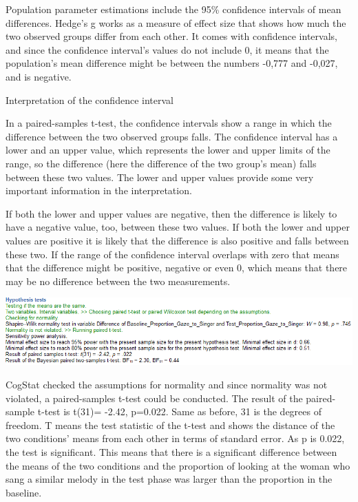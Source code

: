 \documentclass[
]{book}
\begin{document}
Population parameter estimations include the 95\% confidence intervals of mean differences. Hedge's g works as a measure of effect size that shows how much the two observed groups differ from each other. It comes with confidence intervals, and since the confidence interval's values do not include 0, it means that the population's mean difference might be between the numbers -0,777 and -0,027, and is negative.

Interpretation of the confidence interval

In a paired-samples t-test, the confidence intervals show a range in which the difference between the two observed groups falls. The confidence interval has a lower and an upper value, which represents the lower and upper limits of the range, so the difference (here the difference of the two group's mean) falls between these two values. The lower and upper values provide some very important information in the interpretation.

If both the lower and upper values are negative, then the difference is likely to have a negative value, too, between these two values. If both the lower and upper values are positive it is likely that the difference is also positive and falls between these two. If the range of the confidence interval overlaps with zero that means that the difference might be positive, negative or even 0, which means that there may be no difference between the two measurements.

\includegraphics{img/ch6/6.7comparerepeatedmeasures_hyptest.png}

CogStat checked the assumptions for normality and since normality was not violated, a paired-samples t-test could be conducted. The result of the paired-sample t-test is t(31)= -2.42, p=0.022. Same as before, 31 is the degrees of freedom. T means the test statistic of the t-test and shows the distance of the two conditions' means from each other in terms of standard error. As p is 0.022, the test is significant. This means that there is a significant difference between the means of the two conditions and the proportion of looking at the woman who sang a similar melody in the test phase was larger than the proportion in the baseline.
\end{document}
